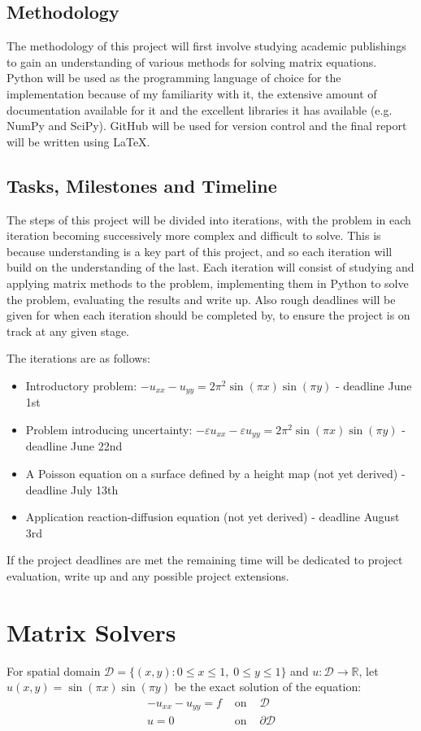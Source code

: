 \documentclass{article}
\numberwithin{equation}{section}
\begin{document}
\subsection{Methodology}
The methodology of this project will first involve studying academic publishings to gain an understanding of various methods for solving matrix equations. Python will be used as the programming language of choice for the implementation because of my familiarity with it, the extensive amount of documentation available for it and the excellent libraries it has available (e.g. NumPy and SciPy). GitHub will be used for version control and the final report will be written using \LaTeX. 

\subsection{Tasks, Milestones and Timeline}
The steps of this project will be divided into iterations, with the problem in each iteration becoming successively more complex and difficult to solve. This is because understanding is a key part of this project, and so each iteration will build on the understanding of the last. Each iteration will consist of studying and applying matrix methods to the problem, implementing them in Python to solve the problem, evaluating the results and write up. Also rough deadlines will be given for when each iteration should be completed by, to ensure the project is on track at any given stage.

The iterations are as follows:
\begin{itemize}
\item Introductory problem: $-u_{xx} - u_{yy} = 2 \pi^2 \sin{(\pi x)} \sin{(\pi y)}$ - deadline June 1st
\item Problem introducing uncertainty: $-\varepsilon u_{xx} - \varepsilon u_{yy} = 2 \pi^2 \sin{(\pi x)} \sin{(\pi y)}$ - deadline June 22nd
\item A Poisson equation on a surface defined by a height map (not yet derived) - deadline July 13th
\item Application reaction-diffusion equation (not yet derived) - deadline August 3rd
\end{itemize}

If the project deadlines are met the remaining time will be dedicated to project evaluation, write up and any possible project extensions.

\newpage

\section{Matrix Solvers}
For spatial domain $\mathcal{D} = \{(x,y) : 0 \leq x \leq 1, \; 0 \leq y \leq 1 \}$ and $u: \mathcal{D} \rightarrow \mathbb{R}$, let $u(x,y) = \sin{(\pi x)} \sin{(\pi y)}$ be the exact solution of the equation:
\begin{eqnarray}
-u_{xx} -u_{yy} = f & \text{ on } & \mathcal{D} \nonumber \\
u = 0 & \text{ on } & \partial \mathcal{D}
\end{eqnarray}
\end{document}
